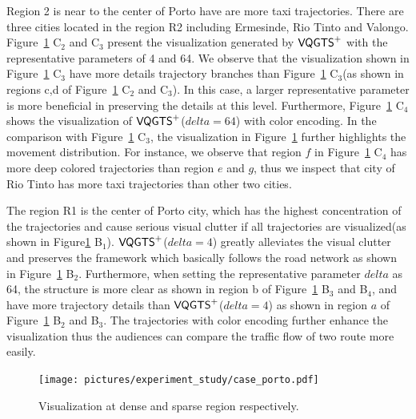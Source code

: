 Region 2 is near to the center of Porto have are more taxi trajectories. There are three cities located in the region R2 including Ermesinde, Rio Tinto and Valongo.  
Figure~\ref{fig:porto} C$_2$ and C$_3$ present the visualization generated by $\mathsf{VQGTS}^{+}$ with the representative parameters of 4 and 64. We observe that the visualization shown in Figure~\ref{fig:porto} C$_3$ have more details trajectory branches than Figure~\ref{fig:porto} C$_3$(as shown in regions c,d of Figure~\ref{fig:porto} C$_2$ and C$_3$). In this case, a larger representative parameter is more beneficial in preserving the details at this level. Furthermore, Figure~\ref{fig:porto} C$_4$ shows the visualization of $\mathsf{VQGTS}^{+}$($delta = 64$) with color encoding. In the comparison with Figure~\ref{fig:porto} C$_3$, the visualization in Figure~\ref{fig:porto} further highlights the movement distribution. 
For instance, we observe that region $f$ in Figure~\ref{fig:porto} C$_4$ has more deep colored trajectories than region $e$ and $g$, thus we inspect that city of Rio Tinto has more taxi trajectories than other two cities.

The region R1 is the center of Porto city, which has the highest concentration of the trajectories and cause serious visual clutter if all trajectories are visualized(as shown in Figure\ref{fig:porto} B$_1$). $\mathsf{VQGTS}^{+}$($delta = 4$) greatly alleviates the visual clutter and preserves the framework which basically follows the road network as shown in Figure~\ref{fig:porto} B$_2$. Furthermore, when setting the representative parameter $delta$ as 64, the structure is more clear as shown in region b of Figure~\ref{fig:porto} B$_3$ and B$_4$, and have more trajectory details than $\mathsf{VQGTS}^{+}$($delta = 4$) as shown in region $a$ of Figure~\ref{fig:porto} B$_2$ and B$_3$. The trajectories with color encoding further enhance the visualization thus the audiences can compare the traffic flow of two route more easily.   
 
 

\begin{figure}[t]
	\centering
	\vspace{2mm}
	\texttt{[image: pictures/experiment\_study/case\_porto.pdf]}
	\caption{Visualization at dense and sparse region respectively.}
	\vspace{0mm}
	\label{fig:porto}
\end{figure}

